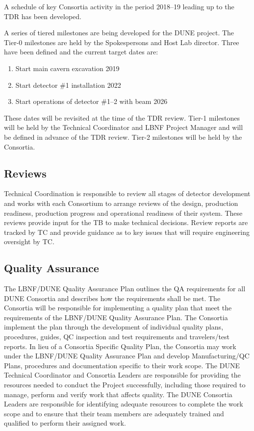 A schedule of key Consortia activity in the period 2018--19 leading up
to the TDR has been developed.

A series of tiered milestones are being developed for the DUNE
project. The Tier-0 milestones are held by the Spokespersons and Host
Lab director. Three have been defined and the current target dates
are:
\begin{enumerate}
\item Start main cavern excavation \hspace{2.1in} 2019
\item Start detector \#1 installation \hspace{2.1in} 2022
\item Start operations of detector \#1--2 with beam \hspace{1in} 2026
\end{enumerate}
These dates will be revisited at the time of the TDR review.  Tier-1
milestones will be held by the Technical Coordinator and LBNF Project
Manager and will be defined in advance of the TDR review. Tier-2
milestones will be held by the Consortia.

\subsection{Reviews}
\label{sec:fdsp-coord-reviews}

Technical Coordination is responsible to review all stages of detector
development and works with each Consortium to arrange reviews of the
design, production readiness, production progress and operational
readiness of their system.  These reviews provide input for the TB to
make technical decisions.  Review reports are tracked by TC and
provide guidance as to key issues that will require engineering
oversight by TC.

\subsection{Quality Assurance}
\label{sec:fdsp-coord-qa}


The LBNF/DUNE Quality Assurance Plan outlines the QA requirements for
all DUNE Consortia and describes how the requirements shall be
met. The Consortia will be responsible for implementing a quality plan
that meet the requirements of the LBNF/DUNE Quality Assurance Plan.
The Consortia implement the plan through the development of individual
quality plans, procedures, guides, QC inspection and test requirements
and travelers/test reports.
In lieu of a Consortia Specific
Quality Plan, the Consortia may work under the LBNF/DUNE Quality
Assurance Plan and develop Manufacturing/QC Plans, procedures and
documentation specific to their work scope.  The DUNE Technical
Coordinator and Consortia Leaders are responsible for providing the
resources needed to conduct the Project successfully, including those
required to manage, perform and verify work that affects quality.  The
DUNE Consortia Leaders are responsible for identifying adequate
resources to complete the work scope and to ensure that their team
members are adequately trained and qualified to perform their assigned
work.

